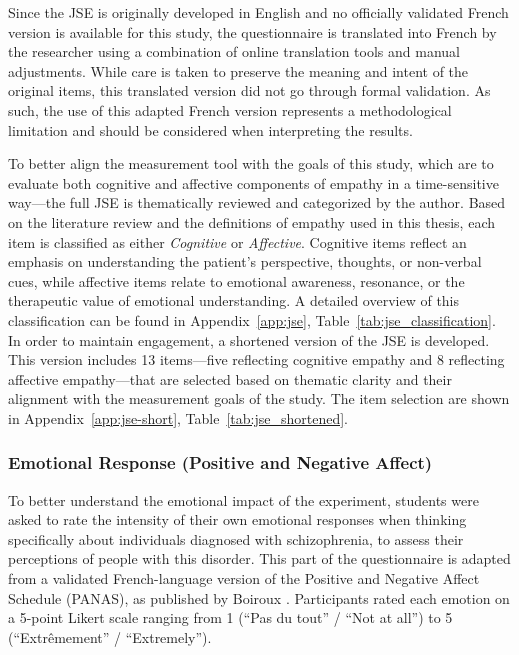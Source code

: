 \vspace{1em}

Since the JSE is originally developed in English and no officially validated French version is available for this study, the questionnaire is translated into French by the researcher using a combination of online translation tools and manual adjustments. While care is taken to preserve the meaning and intent of the original items, this translated version did not go through formal validation. As such, the use of this adapted French version represents a methodological limitation and should be considered when interpreting the results.

\vspace{1em}

To better align the measurement tool with the goals of this study, which are to evaluate both cognitive and affective components of empathy in a time-sensitive way—the full JSE is thematically reviewed and categorized by the author. Based on the literature review and the definitions of empathy used in this thesis, each item is classified as either \textit{Cognitive} or \textit{Affective}. Cognitive items reflect an emphasis on understanding the patient’s perspective, thoughts, or non-verbal cues, while affective items relate to emotional awareness, resonance, or the therapeutic value of emotional understanding. A detailed overview of this classification can be found in Appendix~\ref{app:jse}, Table~\ref{tab:jse_classification}. In order to maintain engagement, a shortened version of the JSE is developed. This version includes 13 items—five reflecting cognitive empathy and 8 reflecting affective empathy—that are selected based on thematic clarity and their alignment with the measurement goals of the study. The item selection are shown in Appendix~\ref{app:jse-short}, Table~\ref{tab:jse_shortened}. %

\subsubsection{Emotional Response (Positive and Negative Affect)}

To better understand the emotional impact of the experiment, students were asked to rate the intensity of their own emotional responses when thinking specifically about individuals diagnosed with schizophrenia, to assess their perceptions of people with this disorder. This part of the questionnaire is adapted from a validated French-language version of the Positive and Negative Affect Schedule (PANAS), as published by Boiroux \cite{Boiroux2024}. Participants rated each emotion on a 5-point Likert scale ranging from 1 (“Pas du tout” / “Not at all”) to 5 (“Extrêmement” / “Extremely”).

